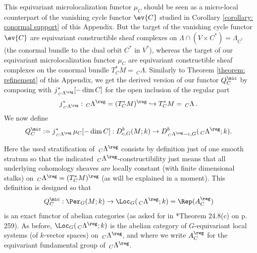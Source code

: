 \documentclass[11pt,letterpaper]{amsart}
\numberwithin{equation}{section}
\begin{document}
This equivariant microlocalization functor $\mu_C$ should be seen as a micro-local counterpart of the vanishing cycle functor
$\ev{C}$ studied in Corollary \ref{corollary: conormal support} of this Appendix. But the target of the vanishing cycle functor
$\ev{C}$ are equivariant constructible sheaf complexes on $\Lambda \cap (V\times C^*) =\Lambda_{C^*}$ (the conormal bundle to the dual orbit $C^*$
in $V^*$),
whereas the target of our equivariant microlocalization functor $\mu_C$ are equivariant constructible sheaf complexes on the conormal bundle $T^*_CM=\,_C\Lambda$.
Similarly to Theorem \ref{theorem: refinement} of this Appendix,
we get the derived version of our functor $Q^\mic_C$
by composing with $j^*_{\,_C\Lambda^\reg}[-\dim C]$ for the open inclusion of the regular part 
$$j^*_{\,_C\Lambda^\reg}: \,_C\Lambda^\reg=(T^*_CM)^\reg \hookrightarrow T^*_CM= \,_C\Lambda \:.$$
We now  define 
\begin{equation}\label{equation: derived Qmic}
Q^\mic_C := j^*_{\,_C\Lambda^\reg}\,\mu_C[-\dim C] :  
D^b_{c,G}(M;k) \to 
D^b_{\,_C\Lambda^\reg-c,G}(\,_C\Lambda^\reg;k).
\end{equation}

Here the used stratification of $\,_C\Lambda^\reg$  consists by definition just of one smooth stratum so that the indicated 
$\,_C\Lambda^\reg$-constructibility just means that all underlying cohomology sheaves are locally constant (with finite dimensional stalks) on $\,_C\Lambda^\reg=(T^*_CM)^\reg$ (as will be explained in a moment).
This definition is designed so that
\begin{equation}\label{equation: def-Qmic}
Q^\mic_C  : \Per_{G}(M;k) \to \Loc_{G}(\,_C\Lambda^\reg;k) = \Rep(A^\reg_{C})
\end{equation}
is an exact functor of abelian categories
(as asked for in \cite{ABV92}*{Theorem 24.8(c) on p. 259}). As before, $\Loc_{G}(\,_C\Lambda^\reg;k)$ is the abelian category of $G$-equivariant local systems (of $k$-vector spaces) on $\,_C\Lambda^\reg$, and where we write $A^\reg_{C}$ for the equivariant fundamental group of $\,_C\Lambda^\reg$.\\
\end{document}
